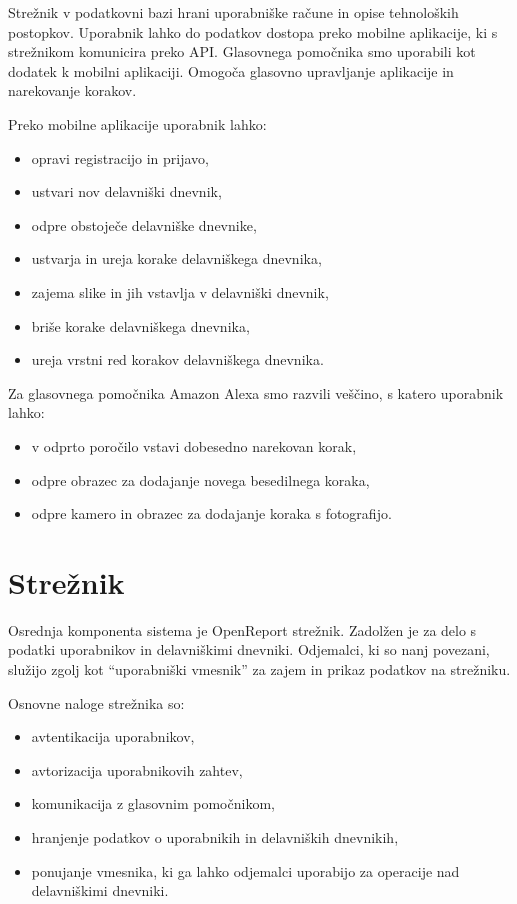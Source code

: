 \documentclass[a4paper, 12pt]{book}
\begin{document}
Strežnik v podatkovni bazi hrani uporabniške račune in opise tehnoloških postopkov.
Uporabnik lahko do podatkov dostopa preko mobilne aplikacije, ki s strežnikom komunicira preko API.
Glasovnega pomočnika smo uporabili kot dodatek k mobilni aplikaciji.
Omogoča glasovno upravljanje aplikacije in narekovanje korakov.

\bigbreak
Preko mobilne aplikacije uporabnik lahko:
\begin{itemize}
	\item opravi registracijo in prijavo,
	\item ustvari nov delavniški dnevnik,
	\item odpre obstoječe delavniške dnevnike,
	\item ustvarja in ureja korake delavniškega dnevnika,
	\item zajema slike in jih vstavlja v delavniški dnevnik,
	\item briše korake delavniškega dnevnika,
	\item ureja vrstni red korakov delavniškega dnevnika.
\end{itemize}

Za glasovnega pomočnika Amazon Alexa smo razvili veščino, s katero uporabnik lahko:

\begin{itemize}
	\item v odprto poročilo vstavi dobesedno narekovan korak,
	\item odpre obrazec za dodajanje novega besedilnega koraka,
	\item odpre kamero in obrazec za dodajanje koraka s fotografijo.
\end{itemize}



\section{Strežnik}

Osrednja komponenta sistema je OpenReport strežnik.
Zadolžen je za delo s podatki uporabnikov in delavniškimi dnevniki.
Odjemalci, ki so nanj povezani, služijo zgolj kot \enquote{uporabniški vmesnik} za zajem in prikaz podatkov na strežniku.


\noindent Osnovne naloge strežnika so:
\begin{itemize}
	\item avtentikacija uporabnikov,
	\item avtorizacija uporabnikovih zahtev,
	\item komunikacija z glasovnim pomočnikom,
	\item hranjenje podatkov o uporabnikih in delavniških dnevnikih, 
	\item ponujanje vmesnika, ki ga lahko odjemalci uporabijo za operacije nad delavniškimi dnevniki.
\end{itemize}
\end{document}
